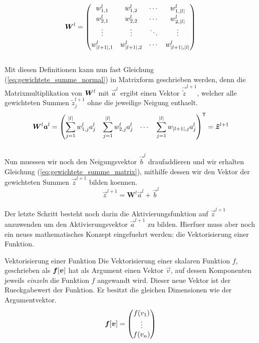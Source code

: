 \begin{equation*}
  \bm{W}^l =
  \begin{pmatrix}
    w_{1,1}^l & w_{1,2}^l & \cdots & w_{1,|l|}^l \\[0.3em]
    w_{2,1}^l & w_{2,2}^l & \cdots & w_{2,|l|}^l \\[0.3em]
    \vdots & \vdots & \ddots & \vdots \\[0.3em]
    w_{|l+1|,1}^l & w_{|l+1|,2}^l & \cdots & w_{|l+1|,|l|}^l
  \end{pmatrix}
\end{equation*}
\\
Mit diesen Definitionen kann nun fast Gleichung (\ref{eq:gewichtete_summe_normal}) in
Matrixform geschrieben werden, denn die Matrixmultiplikation von $\bm{W}^l$ mit
$\vec{a}^{l}$ ergibt einen Vektor $\vec{\tilde{z}}^{l+1}$, welcher alle gewichteten
Summen $\tilde{z}_j^{l+1}$ ohne die jeweilige Neigung enthaelt.
\\
\begin{equation*}
  \bm{W}^l \bm{a}^{l} = \begin{pmatrix}\displaystyle \sum_{j=1}^{|l|} w_{1,j}^l a_j^l &\displaystyle \sum_{j=1}^{|l|} w_{2,j}^l a_j^l & \cdots &\displaystyle \sum_{j=1}^{|l|} w_{|l+1|,j} a_j^l \end{pmatrix}^{\mathsf{T}} = \bm{\tilde{z}}^{l+1}
\end{equation*}
\\
Nun muessen wir noch den Neigungsvektor $\vec{b}^l$ draufaddieren und wir
erhalten Gleichung (\ref{eq:gewichtete_summe_matrix}), mithilfe dessen wir den
Vektor der gewichteten Summen $\vec{z}^{l+1}$ bilden koennen.
\\
\begin{equation}\tag{FP1a}\label{eq:gewichtete_summe_matrix}
  \vec{z}^{l+1} = \mathbf{W}^{l} \vec{a}^{l} + \vec{b}^{l}
\end{equation}
\\
Der letzte Schritt besteht noch darin die Aktivierungsfunktion auf $\vec{z}^{l+1}$
anzuwenden um den Aktivierungsvektor $\vec{a}^{l+1}$ zu bilden.
Hierfuer muss aber noch ein neues mathematisches
Konzept eingefuehrt werden: die Vektorisierung einer Funktion.
\para{}

\begin{defbox}{Vektorisierung einer Funktion}
  Die Vektorisierung einer skalaren Funktion $f$, geschrieben als
  $\bm{f}[\bm{v}]$ hat als Argument einen Vektor $\vec{v}$, auf dessen
  Komponenten jeweils \textit{einzeln} die Funktion $f$ angewandt wird. Dieser neue
  Vektor ist der Rueckgabewert der Funktion. Er besitzt die gleichen Dimensionen
  wie der Argumentvektor.
  \\
  \begin{equation*}
    \bm{f}[\bm{v}]=
    \begin{pmatrix}
      f(v_1)\\
      \vdots \\
      f(v_n)\\
    \end{pmatrix}
  \end{equation*}
\end{defbox}

